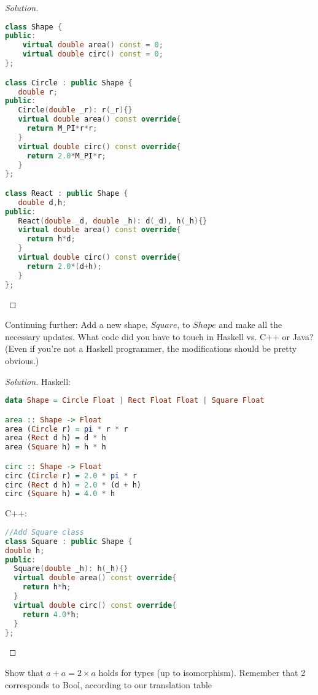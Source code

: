 \documentclass[7x10,thmnumcontwithchapter,WebLink,AddlevelTwoTOC,NumRef,BookEndNote,printer]{pupbook}
\begin{document}
\begin{proof}[Solution]
	~\\
\begin{lstlisting}[language=C++]
class Shape {
public:
	virtual double area() const = 0;
	virtual double circ() const = 0;	
};

class Circle : public Shape {
   double r;
public:
   Circle(double _r): r(_r){}
   virtual double area() const override{
     return M_PI*r*r;
   }
   virtual double circ() const override{
     return 2.0*M_PI*r;
   }
};

class React : public Shape { 
   double d,h;
public:
   React(double _d, double _h): d(_d), h(_h){}
   virtual double area() const override{
	 return h*d;
   }
   virtual double circ() const override{
     return 2.0*(d+h);
   }
};
\end{lstlisting}
\end{proof}



\begin{exercise}
Continuing further: Add a new shape, $Square$, to $Shape$ and make
all the necessary updates. What code did you have to touch in
Haskell vs. C++ or Java? (Even if you’re not a Haskell programmer,
the modifications should be pretty obvious.)
\end{exercise}

\begin{proof}[Solution]
Haskell:
\begin{lstlisting}[language=Haskell]
data Shape = Circle Float | Rect Float Float | Square Float

area :: Shape -> Float
area (Circle r) = pi * r * r
area (Rect d h) = d * h
area (Square h) = h * h

circ :: Shape -> Float
circ (Circle r) = 2.0 * pi * r
circ (Rect d h) = 2.0 * (d + h)
circ (Square h) = 4.0 * h
\end{lstlisting}
C++:
\begin{lstlisting}[language=C++]
//Add Square class
class Square : public Shape { 
double h;
public:
  Square(double _h): h(_h){}
  virtual double area() const override{
    return h*h;
  }
  virtual double circ() const override{
    return 4.0*h;
  }
};
\end{lstlisting}
\end{proof}


\begin{exercise}
Show that $a + a = 2 \times a$ holds for types (up to isomorphism). Remember
that 2 corresponds to Bool, according to our translation table
\end{exercise}
\end{document}
